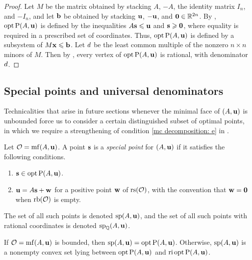 \documentclass{amsart}
\begin{document}
\begin{proof}
   Let $M$ be the matrix obtained by stacking $A$, $-A$, the identity matrix $I_n$, and $-I_n$, and let $\mathbf{b}$ be obtained by stacking $\mathbf{u}$, $-\mathbf{u}$, and $\mathbf{0}\in \mathbb{R}^{2n}$.
   By , $\operatorname{opt} \mathrm{P}(A,\mathbf{u})$ is defined by the inequalities $A\mathbf{s} \leqslant \mathbf{u}$ and $\mathbf{s}\geqslant \mathbf{0}$, where equality is required in a prescribed set of coordinates.
   Thus, $\operatorname{opt} \mathrm{P}(A,\mathbf{u})$ is defined by a subsystem of $M \mathbf{x} \leqslant \mathbf{b}$.
   Let $d$ be the least common multiple of the nonzero $n\times n$ minors of $M$.
   Then by , every vertex of $\operatorname{opt} \mathrm{P}(A,\mathbf{u})$ is rational, with denominator $d$.
\end{proof}

\subsection{Special points and universal denominators}

Technicalities that arise in future sections whenever the minimal face of $(A, \mathbf{u})$ is unbounded force us to consider a certain distinguished subset of optimal points, in which we require a strengthening of condition \eqref{mc decomposition: e} in .

\begin{definition}
   \label{mc: D}
   Let $\mathcal{O} = \operatorname{mf}(A, \mathbf{u})$.
   A point $\mathbf{s}$ is a \emph{special point} for $(A, \mathbf{u})$ if it satisfies the following conditions.
\begin{enumerate}
\item $\mathbf{s} \in \operatorname{opt} \mathrm{P}(A, \mathbf{u})$.
\item $\mathbf{u} = A \mathbf{s} + \mathbf{w}$ for a positive point $\mathbf{w}$ of $\operatorname{rs}(\mathcal{O})$, with the convention that $\mathbf{w}=\mathbf{0}$ when $\operatorname{rb}(\mathcal{O})$ is empty.
\end{enumerate}
The set of all such points is denoted $\operatorname{sp}(A, \mathbf{u})$, and the set of all such points with rational coordinates is denoted $\operatorname{sp}_{\mathbb{Q}}(A, \mathbf{u})$.
\end{definition}

\begin{proposition}
   \label{opt versus mc: P}
   If $\mathcal{O} = \operatorname{mf}(A, \mathbf{u})$ is bounded, then $\operatorname{sp}(A, \mathbf{u}) = \operatorname{opt} \mathrm{P}(A, \mathbf{u})$.  Otherwise,  $\operatorname{sp}(A, \mathbf{u})$ is a nonempty convex set lying between $\operatorname{opt} \mathrm{P}(A, \mathbf{u})$ and $\operatorname{ri} \operatorname{opt} \mathrm{P}(A, \mathbf{u})$.
\end{proposition}
\end{document}
